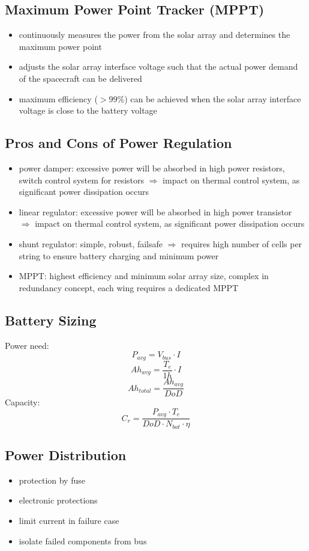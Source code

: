 \subsection{Maximum Power Point Tracker (MPPT)}
\begin{itemize}
 \item continuously measures the power from the solar array and determines the maximum power point 
 \item adjusts the solar array interface voltage such that the actual power demand of the spacecraft can be delivered
 \item maximum efficiency ($>99\%$) can be achieved when the solar array interface voltage is close to the battery voltage
\end{itemize}
\subsection{Pros and Cons of Power Regulation}
\begin{itemize}
 \item power damper: excessive power will be absorbed in high power resistors, switch control system for resistors $\Rightarrow$ impact on thermal control system, as significant power 
 dissipation occurs 
 \item linear regulator: excessive power will be absorbed in high power transistor $\Rightarrow$ impact on thermal control system, as significant power dissipation occurs 
 \item shunt regulator: simple, robust, failsafe $\Rightarrow$ requires high number of cells per string to ensure battery charging and minimum power 
 \item MPPT: highest efficiency and minimum solar array size, complex in redundancy concept, each wing requires a dedicated MPPT
\end{itemize}
\subsection{Battery Sizing}
Power need:
\[P_{avg} = V_{bus}\cdot I\]
\[Ah_{avg} = \frac{T_e}{1h}\cdot I\]
\[Ah_{total} = \frac{Ah_{avg}}{DoD}\]
Capacity:
\[C_r = \frac{P_{avg}\cdot T_e}{DoD\cdot N_{bat} \cdot \eta}\]
\subsection{Power Distribution}
\begin{itemize}
 \item protection by fuse
 \item electronic protections
 \item limit current in failure case
 \item isolate failed components from bus
\end{itemize}
